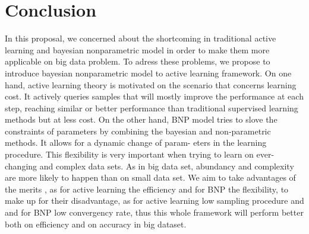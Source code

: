 \section{Conclusion}

In this proposal, we concerned about the shortcoming in traditional active learning and bayesian nonparametric model in order to make them more applicable on big data problem. To adress these problems, we propose to introduce bayesian nonparametric model to active learning framework. On one hand, active learning theory is motivated on the scenario that concerns learning cost. It actively queries samples that will mostly improve the performance at each step, reaching similar or better performance than traditional supervised learning methods but at less cost.  On the other hand, BNP model tries to slove the constraints of parameters by combining the bayesian and non-parametric methods. It allows for a dynamic change of param- eters in the learning procedure. This flexibility is very important when trying to learn on ever-changing and complex data sets. As in big data set, abundancy and complexity are more likely to happen than on small data set. We aim to take advantages of the merits , as for active learning the efficiency and for BNP the flexibility, to make up for their disadvantage, as for active learning low sampling procedure and and for BNP low convergency rate, thus this whole framework will perform better both on efficiency and on accuracy in big dataset. 